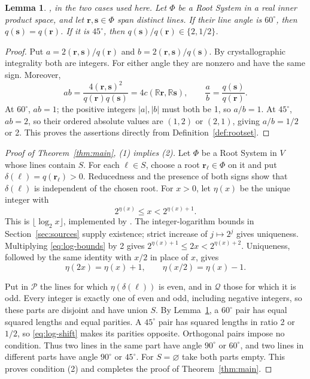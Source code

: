 \documentclass[11pt]{amsart}
\newcommand\cP{{\mathcal P}}
\newcommand\cQ{{\mathcal Q}}
\newcommand\re{{\mathbb R}}%
\newtheorem{lemma}[theorem]{Lemma}
\theoremstyle{definition}
\newcommand{\Zr}{{\mathbf r}}
\newcommand{\Zs}{{\mathbf s}}
\DeclareRobustCommand{\ml}[1]{\ifmmode\text{\normalfont\small\ttfamily\detokenize{#1}}\else{\normalfont\small\nolinkurl{#1}}\fi}
\begin{document}
\begin{lemma}\label{lem:root-angles}
\textup{\cite[Theorem C, root-angle assertion]{R311}, in the two cases used here.}
Let $\Phi$ be a Root System in a real inner product space, and let
$\Zr,\Zs\in\Phi$ span distinct lines. If their line angle is
$60^\circ$, then $q(\Zs)=q(\Zr)$. If it is $45^\circ$, then
$q(\Zs)/q(\Zr)\in\{2,1/2\}$.
\end{lemma}
\begin{proof}
Put $a=2(\Zr,\Zs)/q(\Zr)$ and
$b=2(\Zr,\Zs)/q(\Zs)$. By crystallographic integrality both are
integers. For either angle they are nonzero and have the same sign.
Moreover,
\[
 ab=\frac{4(\Zr,\Zs)^2}{q(\Zr)q(\Zs)}
    =4c(\re\Zr,\re\Zs),
 \qquad \frac{a}{b}=\frac{q(\Zs)}{q(\Zr)}.
\]
At $60^\circ$, $ab=1$; the positive integers $|a|,|b|$ must both
be 1, so $a/b=1$. At $45^\circ$, $ab=2$, so their ordered absolute
values are $(1,2)$ or $(2,1)$, giving $a/b=1/2$ or 2.
This proves the assertions directly from Definition~\ref{def:rootset}.
\end{proof}

\begin{proof}[Proof of Theorem~\ref{thm:main}, (1) implies (2)]
Let $\Phi$ be a Root System in $V$ whose lines contain $S$.
For each $\ell\in S$, choose a root $\Zr_\ell\in\Phi$ on it and
put $\delta(\ell)=q(\Zr_\ell)>0$. Reducedness and the presence of both
signs show that $\delta(\ell)$ is independent of the chosen root.
For $x>0$, let $\eta(x)$ be the unique integer with
\begin{equation}\label{eq:log-bounds}
 2^{\eta(x)}\leq x<2^{\eta(x)+1}.
\end{equation}
This is $\lfloor\log_2 x\rfloor$, implemented by \ml{Int.log 2 x}.
The integer-logarithm bounds in Section~\ref{sec:sources} supply
existence; strict increase of $j\mapsto2^j$ gives uniqueness.
Multiplying \eqref{eq:log-bounds} by 2 gives
$2^{\eta(x)+1}\leq2x<2^{\eta(x)+2}$. Uniqueness, followed by the same
identity with $x/2$ in place of $x$, gives
\begin{equation}\label{eq:log-shift}
 \eta(2x)=\eta(x)+1,\qquad \eta(x/2)=\eta(x)-1.
\end{equation}

Put in $\cP$ the lines for which $\eta(\delta(\ell))$ is even, and
in $\cQ$ those for which it is odd. Every integer is exactly one of
even and odd, including negative integers, so these parts are disjoint
and have union $S$. By Lemma~\ref{lem:root-angles}, a $60^\circ$
pair has equal squared lengths and equal parities. A $45^\circ$ pair
has squared lengths in ratio 2 or $1/2$, so \eqref{eq:log-shift}
makes its parities opposite. Orthogonal pairs impose no condition.
Thus two lines in the same part have angle $90^\circ$ or $60^\circ$,
and two lines in different parts have angle $90^\circ$ or $45^\circ$.
For $S=\varnothing$ take both parts empty. This proves condition (2)
and completes the proof of Theorem~\ref{thm:main}.
\end{proof}
\end{document}
